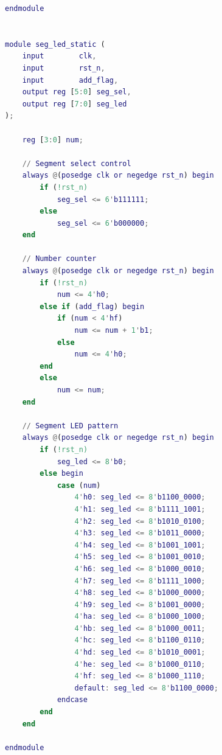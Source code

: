 \documentclass[UTF8]{article}
\theoremstyle{MyLineTheoremStyle} %
\theoremstyle{MyBlockTheoremStyle} %
\theoremstyle{MySubsubsectionStyle} %
\begin{document}
\begin{lstlisting}[language=Matlab, style=MatlabStyle_src]
endmodule


module seg_led_static (
    input        clk,
    input        rst_n,
    input        add_flag,
    output reg [5:0] seg_sel,
    output reg [7:0] seg_led
);

    reg [3:0] num;

    // Segment select control
    always @(posedge clk or negedge rst_n) begin
        if (!rst_n)
            seg_sel <= 6'b111111;
        else
            seg_sel <= 6'b000000;
    end

    // Number counter
    always @(posedge clk or negedge rst_n) begin
        if (!rst_n)
            num <= 4'h0;
        else if (add_flag) begin
            if (num < 4'hf)
                num <= num + 1'b1;
            else
                num <= 4'h0;
        end
        else
            num <= num;
    end

    // Segment LED pattern
    always @(posedge clk or negedge rst_n) begin
        if (!rst_n)
            seg_led <= 8'b0;
        else begin
            case (num)
                4'h0: seg_led <= 8'b1100_0000;
                4'h1: seg_led <= 8'b1111_1001;
                4'h2: seg_led <= 8'b1010_0100;
                4'h3: seg_led <= 8'b1011_0000;
                4'h4: seg_led <= 8'b1001_1001;
                4'h5: seg_led <= 8'b1001_0010;
                4'h6: seg_led <= 8'b1000_0010;
                4'h7: seg_led <= 8'b1111_1000;
                4'h8: seg_led <= 8'b1000_0000;
                4'h9: seg_led <= 8'b1001_0000;
                4'ha: seg_led <= 8'b1000_1000;
                4'hb: seg_led <= 8'b1000_0011;
                4'hc: seg_led <= 8'b1100_0110;
                4'hd: seg_led <= 8'b1010_0001;
                4'he: seg_led <= 8'b1000_0110;
                4'hf: seg_led <= 8'b1000_1110;
                default: seg_led <= 8'b1100_0000;
            endcase
        end
    end

endmodule

\end{lstlisting}
\end{document}
